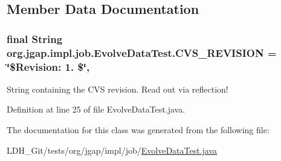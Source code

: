 \subsection{Member Data Documentation}
\hypertarget{classorg_1_1jgap_1_1impl_1_1job_1_1_evolve_data_test_a7222b23700f679f30b4c7cb08517c9c6}{
\subsubsection[{C\-V\-S\-\_\-\-R\-E\-V\-I\-S\-I\-O\-N}]{\setlength{\rightskip}{0pt plus 5cm}final String org.\-jgap.\-impl.\-job.\-Evolve\-Data\-Test.\-C\-V\-S\-\_\-\-R\-E\-V\-I\-S\-I\-O\-N = \char`\"{}\$Revision\-: 1. \$\char`\"{}\hspace{0.3cm}{\ttfamily [static]}, {\ttfamily [private]}}}\label{classorg_1_1jgap_1_1impl_1_1job_1_1_evolve_data_test_a7222b23700f679f30b4c7cb08517c9c6}
String containing the C\-V\-S revision. Read out via reflection! 

Definition at line 25 of file Evolve\-Data\-Test.\-java.



The documentation for this class was generated from the following file\-:\begin{DoxyCompactItemize}
\item 
L\-D\-H\-\_\-\-Git/tests/org/jgap/impl/job/\hyperlink{_evolve_data_test_8java}{Evolve\-Data\-Test.\-java}\end{DoxyCompactItemize}
